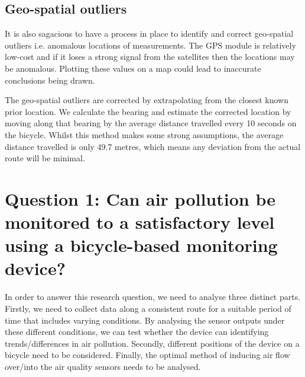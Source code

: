 \documentclass[11pt]{report}
\begin{document}

\subsection{Geo-spatial outliers} \label{gps_outliers}

It is also sagacious to have a process in place to identify and correct geo-spatial outliers i.e. anomalous locations of measurements. The GPS module is relatively low-cost and if it loses a strong signal from the satellites then the locations may be anomalous. Plotting these values on a map could lead to inaccurate conclusions being drawn.

The geo-spatial outliers are corrected by extrapolating from the closest known prior location. We calculate the bearing and estimate the corrected location by moving along that bearing by the average distance travelled every 10 seconds on the bicycle. Whilst this method makes some strong assumptions, the average distance travelled is only 49.7 metres, which means any deviation from the actual route will be minimal.

%



\section{Question 1: Can air pollution be monitored to a satisfactory level using a bicycle-based monitoring device?} \label{meth:q1}

In order to answer this research question, we need to analyse three distinct parts. Firstly, we need to collect data along a consistent route for a suitable period of time that includes varying conditions. By analysing the sensor outputs under these different conditions, we can test whether the device can identifying trends/differences in air pollution. Secondly, different positions of the device on a bicycle need to be considered. Finally, the optimal method of inducing air flow over/into the air quality sensors needs to be analysed.
\end{document}
